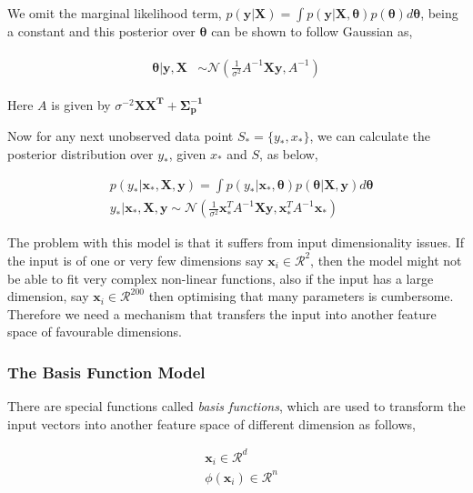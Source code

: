 \documentclass[english]{tktltiki}
\begin{document}
We omit the marginal likelihood term, $p(\mathbf{y} | \mathbf{X}) = \int p(\mathbf{y} | \mathbf{X}, \boldsymbol \theta)p(\boldsymbol \theta)d\boldsymbol \theta$, being a constant and this posterior over $\boldsymbol \theta$ can be shown to follow Gaussian as,

\begin{eqnarray}
\begin{split}
\boldsymbol \theta | \mathbf{y}, \mathbf{X} & \sim \mathcal{N}(\frac{1}{\sigma^2} A^{-1} \mathbf{Xy}, A^{-1})
\end{split}
\end{eqnarray}

Here $A$ is given by $\sigma^{-2} \mathbf{XX^T + \Sigma_p^{-1}}$

Now for any next unobserved data point $S_* = \{y_*, x_*\}$, we can calculate the posterior distribution over $y_*$, given $x_*$ and $S$, as below,

\begin{equation}
\label{conti_rnd_var_bayes_poster}
\begin{split}
	&p(y_* | \mathbf{x}_*, \mathbf{X}, \mathbf{y}) = \int p(y_* | \mathbf{x}_*, \boldsymbol\theta)p(\boldsymbol\theta | \mathbf{X}, \mathbf{y})d \boldsymbol\theta \\
	&y_* | \mathbf{x}_*, \mathbf{X}, \mathbf{y} \sim \mathcal{N}(\frac{1}{\sigma^2}\mathbf{x}_*^T A^{-1} \mathbf{Xy}, \mathbf{x}_*^T A^{-1} \mathbf{x}_*)
\end{split}
\end{equation}

The problem with this model is that it suffers from input dimensionality issues. If the input is of one or very few dimensions say $\mathbf{x}_i \in \mathcal{R}^2$, then the model might not be able to fit very complex non-linear functions, also if the input has a large dimension, say $\mathbf{x}_i \in \mathcal{R}^{200}$ then optimising that many parameters is cumbersome. Therefore we need a mechanism that transfers the input into another feature space of favourable dimensions.


\subsubsection{The Basis Function Model}
There are special functions called \textit{basis functions}, which are used to transform the input vectors into another feature space of different dimension as follows,

\begin{equation}
\label{eqn:basis_function}
\begin{split}
	&\mathbf{x}_i \in \mathcal{R}^d \\
	&\phi(\mathbf{x}_i) \in \mathcal{R}^n
\end{split}
\end{equation}
\end{document}
